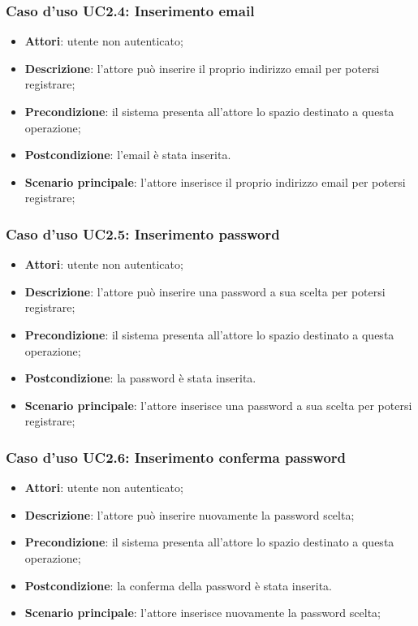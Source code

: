 \subsubsection{Caso d'uso UC2.4: Inserimento email}
\begin{itemize}
\item \textbf{Attori}: utente non autenticato;
\item \textbf{Descrizione}: l'attore può inserire il proprio indirizzo email per potersi registrare;
\item \textbf{Precondizione}: il sistema presenta all'attore lo spazio destinato a questa operazione;
\item \textbf{Postcondizione}: l'email è stata inserita.
\item \textbf{Scenario principale}: l'attore inserisce il proprio indirizzo email per potersi registrare; 
\end{itemize}

\subsubsection{Caso d'uso UC2.5: Inserimento password}
\begin{itemize}
\item \textbf{Attori}: utente non autenticato;
\item \textbf{Descrizione}: l'attore può inserire una password a sua scelta per potersi registrare;
\item \textbf{Precondizione}: il sistema presenta all'attore lo spazio destinato a questa operazione;
\item \textbf{Postcondizione}: la password è stata inserita.
\item \textbf{Scenario principale}: l'attore inserisce una password a sua scelta per potersi registrare;
\end{itemize}

\subsubsection{Caso d'uso UC2.6: Inserimento conferma password}
\begin{itemize}
\item \textbf{Attori}: utente non autenticato;
\item \textbf{Descrizione}: l'attore può inserire nuovamente la password scelta;
\item \textbf{Precondizione}: il sistema presenta all'attore lo spazio destinato a questa operazione;
\item \textbf{Postcondizione}: la conferma della password è stata inserita.
\item \textbf{Scenario principale}: l'attore inserisce nuovamente la password scelta;
\end{itemize}

